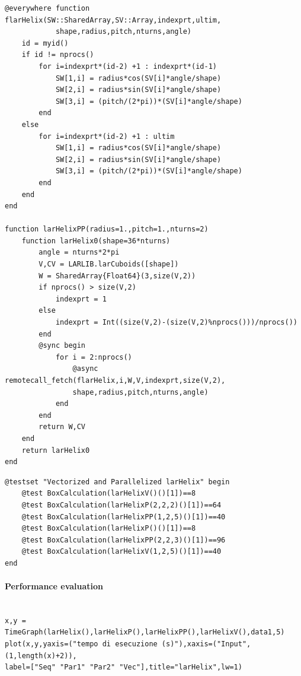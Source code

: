 \documentclass{article}
\begin{document}
\begin{Verbatim}
@everywhere function flarHelix(SW::SharedArray,SV::Array,indexprt,ultim,
            shape,radius,pitch,nturns,angle)
    id = myid()
    if id != nprocs()
        for i=indexprt*(id-2) +1 : indexprt*(id-1)
            SW[1,i] = radius*cos(SV[i]*angle/shape)  
            SW[2,i] = radius*sin(SV[i]*angle/shape)
            SW[3,i] = (pitch/(2*pi))*(SV[i]*angle/shape)
        end
    else
        for i=indexprt*(id-2) +1 : ultim
            SW[1,i] = radius*cos(SV[i]*angle/shape)  
            SW[2,i] = radius*sin(SV[i]*angle/shape)
            SW[3,i] = (pitch/(2*pi))*(SV[i]*angle/shape)
        end
    end
end

function larHelixPP(radius=1.,pitch=1.,nturns=2)
    function larHelix0(shape=36*nturns)
        angle = nturns*2*pi
        V,CV = LARLIB.larCuboids([shape])
        W = SharedArray{Float64}(3,size(V,2))
        if nprocs() > size(V,2)
            indexprt = 1
        else
            indexprt = Int((size(V,2)-(size(V,2)%nprocs()))/nprocs())
        end
        @sync begin
            for i = 2:nprocs()
                @async remotecall_fetch(flarHelix,i,W,V,indexprt,size(V,2),
                shape,radius,pitch,nturns,angle)
            end
        end
        return W,CV 
    end
    return larHelix0 
end
\end{Verbatim}

\begin{Verbatim}
@testset "Vectorized and Parallelized larHelix" begin
    @test BoxCalculation(larHelixV()()[1])==8
    @test BoxCalculation(larHelixP(2,2,2)()[1])==64
    @test BoxCalculation(larHelixPP(1,2,5)()[1])==40
    @test BoxCalculation(larHelixP()()[1])==8
    @test BoxCalculation(larHelixPP(2,2,3)()[1])==96
    @test BoxCalculation(larHelixV(1,2,5)()[1])==40
end
\end{Verbatim}

\paragraph{Performance evaluation}

\begin{Verbatim}

x,y = TimeGraph(larHelix(),larHelixP(),larHelixPP(),larHelixV(),data1,5)
plot(x,y,yaxis=("tempo di esecuzione (s)"),xaxis=("Input",(1,length(x)+2)),
label=["Seq" "Par1" "Par2" "Vec"],title="larHelix",lw=1)

\end{Verbatim}
\end{document}
